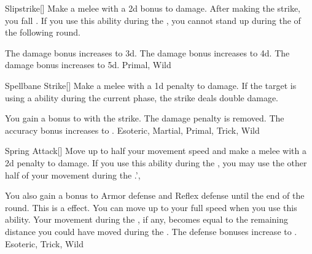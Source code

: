 \lowercase{\hypertarget{maneuver:Slipstrike}{}}\label{maneuver:Slipstrike}
\hypertarget{maneuver:Slipstrike}{}
\begin{freeability}[Rank 1]{Slipstrike}[]
Make a melee  with a \plus2d bonus to damage.
After making the strike, you fall .
If you use this ability during the , you cannot stand up during the  of the following round.

\rankline
{} The damage bonus increases to \plus3d.
 The damage bonus increases to \plus4d.
 The damage bonus increases to \plus5d.
 Primal, Wild
\end{freeability}
\vspace{0.25em}



\lowercase{\hypertarget{maneuver:Spellbane Strike}{}}\label{maneuver:Spellbane Strike}
\hypertarget{maneuver:Spellbane Strike}{}
\begin{freeability}[Rank 1]{Spellbane Strike}[]
Make a melee  with a \minus1d penalty to damage.
If the target is using a  ability during the current phase, the strike deals double damage.

\rankline
{} You gain a  bonus to  with the strike.
 The damage penalty is removed.
 The accuracy bonus increases to .
 Esoteric, Martial, Primal, Trick, Wild
\end{freeability}
\vspace{0.25em}



\lowercase{\hypertarget{maneuver:Spring Attack}{}}\label{maneuver:Spring Attack}
\hypertarget{maneuver:Spring Attack}{}
\begin{freeability}[Rank 1]{Spring Attack}[]
Move up to half your movement speed and make a melee  with a \minus2d penalty to damage.
If you use this ability during the , you may use the other half of your movement during the .',

\rankline
{} You also gain a  bonus to Armor defense and Reflex defense until the end of the round. This is a  effect.
 You can move up to your full speed when you use this ability.
Your movement during the , if any, becomes equal to the remaining distance you could have moved during the .
 The defense bonuses increase to .
 Esoteric, Trick, Wild
\end{freeability}
\vspace{0.25em}



